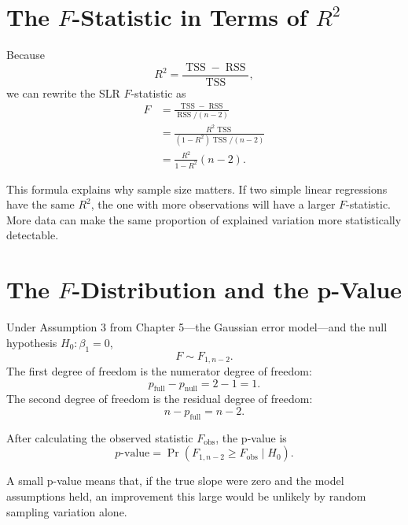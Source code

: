 \section{The \texorpdfstring{$F$}{F}-Statistic in Terms of \texorpdfstring{$R^2$}{R-squared}}

Because
\begin{equation}
  R^2=\frac{\operatorname{TSS}-\operatorname{RSS}}{\operatorname{TSS}},
\end{equation}
we can rewrite the SLR $F$-statistic as
\begin{align}
  F
  &=\frac{\operatorname{TSS}-\operatorname{RSS}}{\operatorname{RSS}/(n-2)} \\
  &=\frac{R^2\operatorname{TSS}}{(1-R^2)\operatorname{TSS}/(n-2)} \\
  &=\boxed{\frac{R^2}{1-R^2}(n-2).}
  \label{eq:ch6-f-in-terms-r2}
\end{align}

This formula explains why sample size matters.  If two simple linear regressions have the same $R^2$, the one with more observations will have a larger $F$-statistic.  More data can make the same proportion of explained variation more statistically detectable.

\section{The \texorpdfstring{$F$}{F}-Distribution and the p-Value}

Under Assumption 3 from Chapter 5---the Gaussian error model---and the null hypothesis $H_0:\beta_1=0$,
\begin{equation}
  F \sim F_{1,n-2}.
\end{equation}
The first degree of freedom is the numerator degree of freedom:
\begin{equation}
  p_{\text{full}}-p_{\text{null}}=2-1=1.
\end{equation}
The second degree of freedom is the residual degree of freedom:
\begin{equation}
  n-p_{\text{full}}=n-2.
\end{equation}

After calculating the observed statistic $F_{\text{obs}}$, the p-value is
\begin{equation}
  p\text{-value}=\Pr\left(F_{1,n-2}\geq F_{\text{obs}}\mid H_0\right).
\end{equation}

A small p-value means that, if the true slope were zero and the model assumptions held, an improvement this large would be unlikely by random sampling variation alone.

